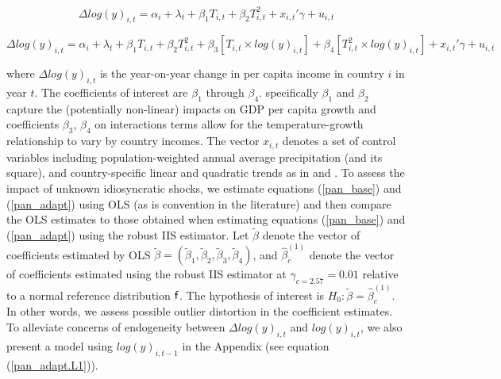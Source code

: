 \documentclass[11pt, letterpaper]{article}
\numberwithin{algorithm}{section}
\numberwithin{assumption}{section}
\numberwithin{lemma}{section}
\numberwithin{theorem}{section}
\numberwithin{corollary}{section}
\numberwithin{remark}{section}
\numberwithin{equation}{section}
\numberwithin{figure}{section}
\numberwithin{table}{section}
\begin{document}
\begin{small}
\begin{equation}
\label{pan_base}
\Delta log(y)_{i,t} = \alpha_i + \lambda_t + \beta_1 T_{i,t} + \beta_2 T^2_{i,t} + x_{i,t}'\gamma + u_{i,t}
\end{equation}
\end{small}


\begin{small}
\begin{equation}
\label{pan_adapt}
\Delta log(y)_{i,t} = \alpha_i + \lambda_t + \beta_1 T_{i,t} + \beta_2 T^2_{i,t} + \beta_3 \left[ T_{i,t} \times  log(y)_{i, t} \right] + \beta_4 \left[  T^2_{i,t} \times  log(y)_{i, t} \right] + x_{i,t}'\gamma + u_{i,t}
\end{equation}
\end{small}

where $\Delta log(y)_{i,t}$ is the year-on-year change in per capita income in country $i$ in year $t$. The coefficients of interest are $\beta_1$ through $\beta_4$. specifically $\beta_1$ and $\beta_2$ capture the (potentially non-linear) impacts on GDP per capita growth and coefficients $\beta_3$, $\beta_4$ on interactions terms allow for the temperature-growth relationship to vary by country incomes. The vector $x_{i,t}$ denotes a set of control variables including population-weighted annual average precipitation (and its square), and country-specific linear and quadratic trends as in \citet{burke2015global} and \citet{pretis2018uncertain}. To assess the impact of unknown idiosyncratic shocks, we estimate equations (\ref{pan_base}) and (\ref{pan_adapt}) using OLS (as is convention in the literature) and then compare the OLS estimates to those obtained when estimating equations (\ref{pan_base}) and (\ref{pan_adapt}) using the robust IIS estimator. Let $\tilde{\beta}$ denote the vector of coefficients estimated by OLS $\tilde{\beta}=(\tilde{\beta}_1, \tilde{\beta}_2, \tilde{\beta}_3, \tilde{\beta}_4)$, and $\hat{\beta}^{( 1)}_{c}$ denote the vector of coefficients estimated using the robust IIS estimator at $\gamma_{c=2.57}=0.01$ relative to a normal reference distribution ${\sf f}$. The hypothesis of interest is $H_0: \tilde{\beta} = \hat{\beta}^{( 1)}_{c}$. In other words, we assess possible outlier distortion in the coefficient estimates. To alleviate concerns of endogeneity between $\Delta log(y)_{i,t}$ and $log(y)_{i, t}$, we also present a model using $log(y)_{i, t-1}$ in the Appendix (see equation (\ref{pan_adapt.L1})).
\end{document}

